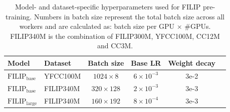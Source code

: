 \begin{table}
    \centering
    \caption{Model- and dataset-specific hyperparameters used for FILIP pre-training.
    Numbers in batch size represent the total batch size across all workers and are calculated as: batch size per GPU $\times$ \#GPUs. FILIP340M is the combination of FILIP300M, YFCC100M, CC12M and CC3M.}
    \label{tab:Model_and_dataset_specific hyperparameters}
    \begin{minipage}{\textwidth}
        \centering
          \begin{tabular}{l|l|cccc}
        \toprule 
        Model  & Dataset  & Batch size & Base LR & Weight decay &  \\
        \midrule 
        $\text{FILIP}_{\text{base}}$ & YFCC100M & $1024 \times 8 $  & $6 \times 10^{-3}$ & 3e-2 \\
        $\text{FILIP}_{\text{base}}$  & FILIP340M & $ 320 \times 128 $ & $ 2 \times 10^{-3}$ & 3e-3  \\
        \midrule
        $\text{FILIP}_{\text{large}}$ & FILIP340M & $ 160 \times 192 $ &  $ 8 \times 10^{-4}$ & 3e-3  \\ 
        
        \bottomrule
    \end{tabular}
    \end{minipage}
\end{table}


